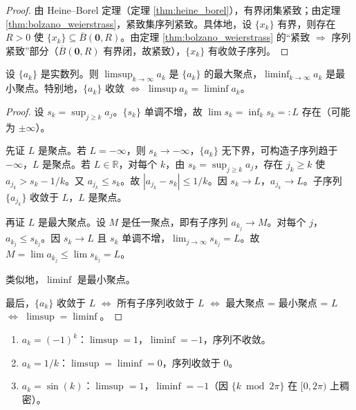 \begin{proof}
由 Heine--Borel 定理（定理 \ref{thm:heine_borel}），有界闭集紧致；由定理 \ref{thm:bolzano_weierstrass}，紧致集序列紧致。具体地，设 $\{x_k\}$ 有界，则存在 $R > 0$ 使 $\{x_k\} \subseteq \overline{B}(\mathbf{0}, R)$。由定理 \ref{thm:bolzano_weierstrass} 的“紧致 $\Rightarrow$ 序列紧致”部分（$\overline{B}(\mathbf{0}, R)$ 有界闭，故紧致），$\{x_k\}$ 有收敛子序列。
\end{proof}

\begin{proposition}[上下极限与聚点的关系]\label{prop:limsup_cluster}
设 $\{a_k\}$ 是实数列。则 $\limsup_{k \to \infty} a_k$ 是 $\{a_k\}$ 的最大聚点，$\liminf_{k \to \infty} a_k$ 是最小聚点。特别地，$\{a_k\}$ 收敛 $\iff$ $\limsup a_k = \liminf a_k$。
\end{proposition}

\begin{proof}
设 $s_k = \sup_{j \ge k} a_j$。$\{s_k\}$ 单调不增，故 $\lim s_k = \inf_k s_k =: L$ 存在（可能为 $\pm\infty$）。

先证 $L$ 是聚点。若 $L = -\infty$，则 $s_k \to -\infty$，$\{a_k\}$ 无下界，可构造子序列趋于 $-\infty$，$L$ 是聚点。若 $L \in \mathbb{R}$，对每个 $k$，由 $s_k = \sup_{j \ge k} a_j$，存在 $j_k \ge k$ 使 $a_{j_k} > s_k - 1/k$。又 $a_{j_k} \le s_k$。故 $|a_{j_k} - s_k| \le 1/k$。因 $s_k \to L$，$a_{j_k} \to L$。子序列 $\{a_{j_k}\}$ 收敛于 $L$，$L$ 是聚点。

再证 $L$ 是最大聚点。设 $M$ 是任一聚点，即有子序列 $a_{k_j} \to M$。对每个 $j$，$a_{k_j} \le s_{k_j}$。因 $s_k \to L$ 且 $s_k$ 单调不增，$\lim_{j \to \infty} s_{k_j} = L$。故 $M = \lim a_{k_j} \le \lim s_{k_j} = L$。

类似地，$\liminf$ 是最小聚点。

最后，$\{a_k\}$ 收敛于 $L$ $\iff$ 所有子序列收敛于 $L$ $\iff$ 最大聚点 = 最小聚点 = $L$ $\iff$ $\limsup = \liminf$。
\end{proof}

\begin{example}[上下极限的计算]\label{ex:limsup_example}
\begin{enumerate}[label=(\roman*)]
    \item $a_k = (-1)^k$：$\limsup = 1$，$\liminf = -1$，序列不收敛。
    \item $a_k = 1/k$：$\limsup = \liminf = 0$，序列收敛于 $0$。
    \item $a_k = \sin(k)$：$\limsup = 1$，$\liminf = -1$（因 $\{k \bmod 2\pi\}$ 在 $[0, 2\pi)$ 上稠密）。
\end{enumerate}
\end{example}

